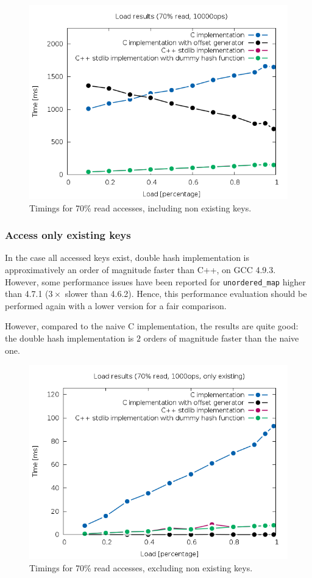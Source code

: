 \documentclass[oneside]{article}
\begin{document}
\begin{figure}
	\centering
	\includegraphics[height=.45\textheight]{result_example_contains.png}
	\caption{Timings for 70\% read accesses, including non existing keys.}
	\label{fig:result_contains}
\end{figure}

\subsubsection{Access only existing keys}
In the case all accessed keys exist, double hash implementation is approximatively an order of magnitude faster than C++, on GCC 4.9.3. However, some performance issues have been reported for \texttt{unordered\_map} higher than 4.7.1 ($3\times$ slower than 4.6.2). Hence, this performance evaluation should be performed again with a lower version for a fair comparison. 

However, compared to the naive C implementation, the results are quite good: the double hash implementation is $2$ orders of magnitude faster than the naive one.

\begin{figure}
	\centering
	\includegraphics[height=.45\textheight]{result_example_no_contains.png}
	\caption{Timings for 70\% read accesses, excluding non existing keys.}
	\label{fig:result_no_contains}
\end{figure}
\end{document}
